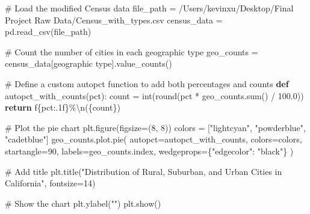 \documentclass[
  letterpaper,
  DIV=11,
  numbers=noendperiod]{scrartcl}
\newenvironment{Shaded}{\begin{snugshade}}{\end{snugshade}}
\newcommand{\BuiltInTok}[1]{\textcolor[rgb]{0.00,0.23,0.31}{#1}}
\newcommand{\CharTok}[1]{\textcolor[rgb]{0.13,0.47,0.30}{#1}}
\newcommand{\CommentTok}[1]{\textcolor[rgb]{0.37,0.37,0.37}{#1}}
\newcommand{\ControlFlowTok}[1]{\textcolor[rgb]{0.00,0.23,0.31}{\textbf{#1}}}
\newcommand{\DecValTok}[1]{\textcolor[rgb]{0.68,0.00,0.00}{#1}}
\newcommand{\FloatTok}[1]{\textcolor[rgb]{0.68,0.00,0.00}{#1}}
\newcommand{\KeywordTok}[1]{\textcolor[rgb]{0.00,0.23,0.31}{\textbf{#1}}}
\newcommand{\NormalTok}[1]{\textcolor[rgb]{0.00,0.23,0.31}{#1}}
\newcommand{\OperatorTok}[1]{\textcolor[rgb]{0.37,0.37,0.37}{#1}}
\newcommand{\SpecialCharTok}[1]{\textcolor[rgb]{0.37,0.37,0.37}{#1}}
\newcommand{\SpecialStringTok}[1]{\textcolor[rgb]{0.13,0.47,0.30}{#1}}
\newcommand{\StringTok}[1]{\textcolor[rgb]{0.13,0.47,0.30}{#1}}
\begin{document}
\begin{Shaded}
\begin{Highlighting}[]
\CommentTok{\# Load the modified Census data}
\NormalTok{file\_path }\OperatorTok{=} \StringTok{\textquotesingle{}/Users/kevinxu/Desktop/Final Project Raw Data/Census\_with\_types.csv\textquotesingle{}}
\NormalTok{census\_data }\OperatorTok{=}\NormalTok{ pd.read\_csv(file\_path)}

\CommentTok{\# Count the number of cities in each geographic type}
\NormalTok{geo\_counts }\OperatorTok{=}\NormalTok{ census\_data[}\StringTok{\textquotesingle{}geographic type\textquotesingle{}}\NormalTok{].value\_counts()}

\CommentTok{\# Define a custom autopct function to add both percentages and counts}
\KeywordTok{def}\NormalTok{ autopct\_with\_counts(pct):}
\NormalTok{    count }\OperatorTok{=} \BuiltInTok{int}\NormalTok{(}\BuiltInTok{round}\NormalTok{(pct }\OperatorTok{*}\NormalTok{ geo\_counts.}\BuiltInTok{sum}\NormalTok{() }\OperatorTok{/} \FloatTok{100.0}\NormalTok{))}
    \ControlFlowTok{return} \SpecialStringTok{f\textquotesingle{}}\SpecialCharTok{\{}\NormalTok{pct}\SpecialCharTok{:.1f\}}\SpecialStringTok{\%}\CharTok{\textbackslash{}n}\SpecialStringTok{(}\SpecialCharTok{\{}\NormalTok{count}\SpecialCharTok{\}}\SpecialStringTok{)\textquotesingle{}}  

\CommentTok{\# Plot the pie chart}
\NormalTok{plt.figure(figsize}\OperatorTok{=}\NormalTok{(}\DecValTok{8}\NormalTok{, }\DecValTok{8}\NormalTok{))}
\NormalTok{colors }\OperatorTok{=}\NormalTok{ [}\StringTok{"lightcyan"}\NormalTok{, }\StringTok{"powderblue"}\NormalTok{, }\StringTok{"cadetblue"}\NormalTok{]  }
\NormalTok{geo\_counts.plot.pie(}
\NormalTok{    autopct}\OperatorTok{=}\NormalTok{autopct\_with\_counts,  }
\NormalTok{    colors}\OperatorTok{=}\NormalTok{colors,}
\NormalTok{    startangle}\OperatorTok{=}\DecValTok{90}\NormalTok{,}
\NormalTok{    labels}\OperatorTok{=}\NormalTok{geo\_counts.index,  }
\NormalTok{    wedgeprops}\OperatorTok{=}\NormalTok{\{}\StringTok{"edgecolor"}\NormalTok{: }\StringTok{"black"}\NormalTok{\} }
\NormalTok{)}

\CommentTok{\# Add title}
\NormalTok{plt.title(}\StringTok{"Distribution of Rural, Suburban, and Urban Cities in California"}\NormalTok{, fontsize}\OperatorTok{=}\DecValTok{14}\NormalTok{)}

\CommentTok{\# Show the chart}
\NormalTok{plt.ylabel(}\StringTok{""}\NormalTok{) }
\NormalTok{plt.show()}
\end{Highlighting}
\end{Shaded}
\end{document}
